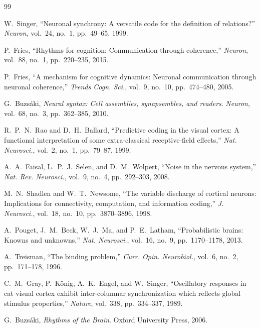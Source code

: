 \documentclass[12pt,a4paper]{article}
\theoremstyle{remark}
\begin{document}

\begin{thebibliography}{99}

W.~Singer, ``Neuronal synchrony: A versatile code for the definition of
relations?'' \emph{Neuron}, vol.~24, no.~1, pp.~49--65, 1999.

P.~Fries, ``Rhythms for cognition: Communication through coherence,''
\emph{Neuron}, vol.~88, no.~1, pp.~220--235, 2015.

P.~Fries, ``A mechanism for cognitive dynamics: Neuronal communication
through neuronal coherence,'' \emph{Trends Cogn. Sci.}, vol.~9, no.~10,
pp.~474--480, 2005.

G.~Buzs\'{a}ki, \emph{Neural syntax: Cell assemblies, synapsembles, and
readers}. \emph{Neuron}, vol.~68, no.~3, pp.~362--385, 2010.

R.~P.~N.~Rao and D.~H.~Ballard, ``Predictive coding in the visual cortex:
A functional interpretation of some extra-classical receptive-field effects,''
\emph{Nat. Neurosci.}, vol.~2, no.~1, pp.~79--87, 1999.

A.~A.~Faisal, L.~P.~J.~Selen, and D.~M.~Wolpert, ``Noise in the nervous
system,'' \emph{Nat. Rev. Neurosci.}, vol.~9, no.~4, pp.~292--303, 2008.

M.~N.~Shadlen and W.~T.~Newsome, ``The variable discharge of cortical
neurons: Implications for connectivity, computation, and information coding,''
\emph{J. Neurosci.}, vol.~18, no.~10, pp.~3870--3896, 1998.

A.~Pouget, J.~M.~Beck, W.~J.~Ma, and P.~E.~Latham, ``Probabilistic brains:
Knowns and unknowns,'' \emph{Nat. Neurosci.}, vol.~16, no.~9, pp.~1170--1178,
2013.

A.~Treisman, ``The binding problem,'' \emph{Curr. Opin. Neurobiol.}, vol.~6,
no.~2, pp.~171--178, 1996.

C.~M.~Gray, P.~K\"{o}nig, A.~K.~Engel, and W.~Singer, ``Oscillatory
responses in cat visual cortex exhibit inter-columnar synchronization which
reflects global stimulus properties,'' \emph{Nature}, vol.~338, pp.~334--337,
1989.

G.~Buzs\'{a}ki, \emph{Rhythms of the Brain}. Oxford University Press, 2006.


\end{thebibliography}
\end{document}
